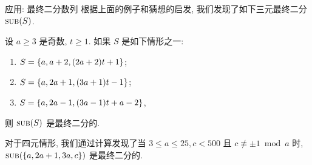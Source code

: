 \documentclass[aspectratio=169,handout]{ctexbeamer}
\DeclareMathOperator*{\SUB}{{\text{{\upshape\textsc{sub}}}}}
\begin{document}
\begin{frame}{应用: 最终二分数列}
	\onslide<+->
	根据上面的例子和猜想的启发, 我们发现了如下三元最终二分 $\SUB(S)$.
	\onslide<+->
	\begin{theorem}
		设 $a\ge 3$ 是奇数, $t\ge 1$.
		如果 $S$ 是如下情形之一:
		\begin{enumerate}
			\item $S={\left\{a,a+2,(2a+2)t+1\right\}}$;
			\item $S={\left\{a,2a+1,(3a+1)t-1\right\}}$;
			\item $S={\left\{a,2a-1,(3a-1)t+a-2\right\}}$,
		\end{enumerate}
		则 $\SUB(S)$ 是最终二分的.
	\end{theorem}
	\onslide<+->
	对于四元情形, 我们通过计算发现了当 $3\le a\le 25, c<500$ 且 $c\not\equiv \pm1 \bmod a$ 时, $\SUB(\set{a,2a+1,3a,c})$ 是最终二分的.
\end{frame}
\end{document}
